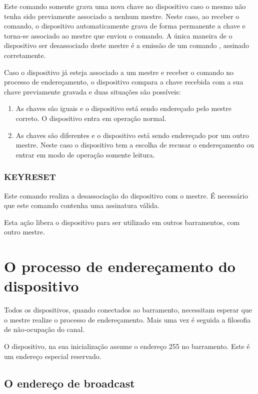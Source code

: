 Este comando somente grava uma nova chave no dispositivo caso o mesmo não tenha sido previamente associado a nenhum mestre. Neste caso, ao receber o comando, o dispositivo automaticamente grava de forma permanente a chave e torna-se associado ao mestre que enviou o comando. A única maneira de o dispositivo ser desassociado deste mestre é a emissão de um comando , assinado corretamente.

Caso o dispositivo já esteja associado a um mestre e receber o comando  no processo de endereçamento, o dispositivo compara a chave recebida com a sua chave previamente gravada e duas situações são possíveis:

\begin{enumerate}

\item As chaves são iguais e o dispositivo está sendo endereçado pelo mestre correto. O dispositivo entra em operação normal.

\item As chaves são diferentes e o dispositivo está sendo endereçado por um outro mestre. Neste caso o dispositivo tem a escolha de recusar o endereçamento ou entrar em modo de operação somente leitura.

\end{enumerate}

\subsubsection{KEYRESET}

Este comando realiza a desassociação do dispositivo com o mestre. É necessário que este comando contenha uma assinatura válida.

Esta ação libera o dispositivo para ser utilizado em outros barramentos, com outro mestre.

\section{O processo de endereçamento do dispositivo}

Todos os dispositivos, quando conectados ao barramento, necessitam esperar que o mestre realize o processo de endereçamento. Mais uma vez é seguida a filosofia de não-ocupação do canal.

O dispositivo, na sua inicialização assume o endereço 255 no barramento. Este é um endereço especial reservado.

\subsection{O endereço de broadcast}

